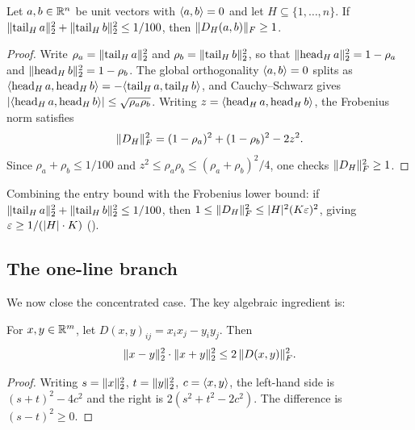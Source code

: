 \begin{lemma}\label{lem:head-frobenius}
Let $a, b \in \mathbb{R}^n$ be unit vectors with $\langle a,b\rangle = 0$ and let
$H \subseteq \{1, \dots, n\}$. If
$\lVert \operatorname{tail}_H a \rVert_2^2 + \lVert \operatorname{tail}_H b \rVert_2^2 \le 1/100$,
then $\lVert D_H(a,b) \rVert_F \ge 1$.
\end{lemma}

\begin{proof}
Write $\rho_a = \lVert \operatorname{tail}_H a \rVert_2^2$ and
$\rho_b = \lVert \operatorname{tail}_H b \rVert_2^2$, so that
$\lVert \operatorname{head}_H a \rVert_2^2 = 1 - \rho_a$ and
$\lVert \operatorname{head}_H b \rVert_2^2 = 1 - \rho_b$. The global orthogonality
$\langle a,b\rangle = 0$ splits as
$\langle \operatorname{head}_H a,\operatorname{head}_H b\rangle
= -\langle \operatorname{tail}_H a,\operatorname{tail}_H b\rangle$,
and Cauchy--Schwarz gives
$\lvert \langle \operatorname{head}_H a,\operatorname{head}_H b\rangle \rvert \le \sqrt{\rho_a \rho_b}$.
Writing $z = \langle \operatorname{head}_H a,\operatorname{head}_H b\rangle$, the Frobenius norm satisfies
\[
\lVert D_H \rVert_F^2
= (1 - \rho_a)^2 + (1 - \rho_b)^2 - 2z^2.
\]
Since $\rho_a + \rho_b \le 1/100$ and
$z^2 \le \rho_a \rho_b \le (\rho_a + \rho_b)^2/4$,
one checks $\lVert D_H \rVert_F^2 \ge 1$.
\end{proof}

Combining the entry bound with the Frobenius lower bound:
if $\lVert \operatorname{tail}_H a \rVert_2^2 + \lVert \operatorname{tail}_H b \rVert_2^2 \le 1/100$, then
$1 \le \lVert D_H \rVert_F^2 \le \lvert H \rvert^2 (K\varepsilon)^2$, giving
$\varepsilon \ge 1/(\lvert H \rvert \cdot K)$
().

\subsection{The one-line branch}\label{sec:one-line}

We now close the concentrated case. The key algebraic ingredient is:

\begin{lemma}\label{lem:rank-one}
For $x, y \in \mathbb{R}^m$, let $D(x,y)_{ij} = x_i x_j - y_i y_j$. Then
\[
\lVert x - y \rVert_2^2 \cdot \lVert x + y \rVert_2^2
\le 2\,\lVert D(x,y) \rVert_F^2.
\]
\end{lemma}

\begin{proof}
Writing $s = \lVert x \rVert_2^2$, $t = \lVert y \rVert_2^2$, $c = \langle x,y\rangle$, the
left-hand side is $(s + t)^2 - 4c^2$ and the right is
$2(s^2 + t^2 - 2c^2)$. The difference is $(s - t)^2 \ge 0$.
\end{proof}

